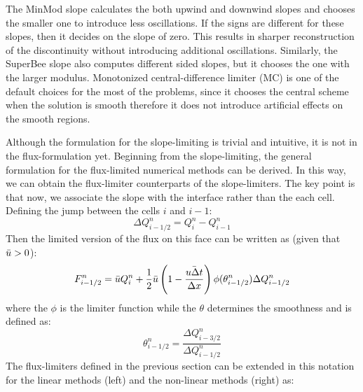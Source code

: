 \documentclass[journal,onecolumn]{IEEEtran}
\begin{document}
The MinMod slope calculates the both upwind and downwind slopes and chooses the smaller one to introduce less oscillations. If the signs are different for these slopes, then it decides on the slope of zero. This results in sharper reconstruction of the discontinuity without introducing additional oscillations. Similarly, the SuperBee slope also computes different sided slopes, but it chooses the one with the larger modulus. Monotonized central-difference limiter (MC) is one of the default choices for the most of the problems, since it chooses the central scheme when the solution is smooth therefore it does not introduce artificial effects on the smooth regions.
\par
Although the formulation for the slope-limiting is trivial and intuitive, it is not in the flux-formulation yet. Beginning from the slope-limiting, the general formulation for the flux-limited numerical methods can be derived. In this way, we can obtain the flux-limiter counterparts of the slope-limiters. The key point is that now, we associate the slope with the interface rather than the each cell. Defining the jump between the cells $i$ and $i-1$:
$$
    \Delta Q^n_{i-1/2} = Q^n_i - Q_{i-1}^n 
$$
Then the limited version of the flux on this face can be written as (given that $\Bar{u} > 0$):
$$
    F_{i-1/2}^n = \Bar{u}Q_i^n + \frac{1}{2}\Bar{u}\left(1 - \frac{\Bar{u\Delta t}}{\Delta x}\right) \phi(\theta^n_{i-1/2})\Delta Q^n_{i-1/2}
$$
where the $\phi$ is the limiter function while the $\theta$ determines the smoothness and is defined as:
$$
    \theta_{i-1/2}^n = \frac{\Delta Q^n_{i-3/2}}{\Delta Q^n_{i-1/2}}
$$
The flux-limiters defined in the previous section can be extended in this notation for the linear methods (left) and the non-linear methods (right) as:
\end{document}
